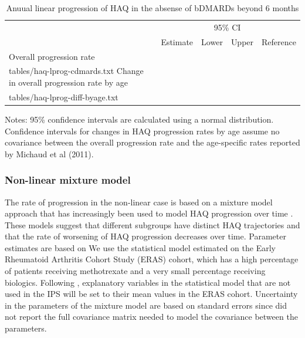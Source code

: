 \documentclass[11pt,final,fleqn]{article}\usepackage[]{graphicx}\usepackage[]{color}
\makeatletter
\theoremstyle{plain}
\newcommand*\ExpandableInput[1]{\@@input#1 }
\makeatother
\begin{document}
\begin{table}[!ht]
\begin{center}
\begin{threeparttable}
\caption{Anuual linear progression of HAQ in the absense of bDMARDs beyond 6 months} \label{tbl:haq-lprog}
\footnotesize
\begin{tabularx}{\textwidth}{@{\extracolsep{\fill}}lrrrl}
\hline
\multicolumn{2}{l}{} & \multicolumn{2}{c}{95\% CI} & \multicolumn{1}{l}{} \\
\cmidrule{3-4} 
\multicolumn{1}{l}{} & \multicolumn{1}{r}{Estimate} & \multicolumn{1}{r}{Lower} & \multicolumn{1}{r}{Upper} & \multicolumn{1}{l}{Reference} \\
\hline
Overall progression rate \\
\ExpandableInput{tables/haq-lprog-cdmards.txt}
Change in overall progression rate by age \\
\ExpandableInput{tables/haq-lprog-diff-byage.txt}
\hline
\end{tabularx}
\scriptsize
Notes: 95\% confidence intervals are calculated using a normal distribution. Confidence intervals for changes in HAQ progression rates by age assume no covariance between the overall progression rate and the age-specific rates reported by Michaud et al (2011).
\end{threeparttable}
\end{center}
\end{table}

\subsubsection{Non-linear mixture model} \label{sec:haq-mixture}

The rate of progression in the non-linear case is based on a mixture model approach that has increasingly been used to model HAQ progression over time \citep{stevenson2016adalimumab, norton2013trajectories, norton2014health}. These models suggest that different subgroups have distinct HAQ trajectories and that the rate of worsening of HAQ progression decreases over time. Parameter estimates are based on We use the statistical model estimated on the Early Rheumatoid Arthritis Cohort Study (ERAS) cohort, which has a high percentage of patients receiving methotrexate and a very small percentage receiving biologics. Following \citet{stevenson2016adalimumab}, explanatory variables in the statistical model that are not used in the IPS will be set to their mean values in the ERAS cohort. Uncertainty in the parameters of the mixture model are based on standard errors since \citet{norton2013trajectories} did not report the full covariance matrix needed to model the covariance between the parameters.
\end{document}
